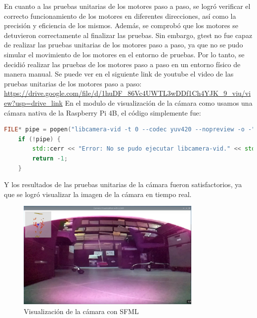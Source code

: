     En cuanto a las pruebas unitarias de los motores paso a paso, se logr\'o verificar el correcto funcionamiento de los motores en diferentes direcciones,
    as\'i como la precisi\'on y eficiencia de los mismos. Adem\'as, se comprob\'o que los motores se detuvieron correctamente al finalizar las pruebas.
    \vskip 0.5cm
    Sin embargo, gtest no fue capaz de realizar las pruebas unitarias de los motores paso a paso, ya que no se pudo simular el movimiento de los motores
    en el entorno de pruebas. Por lo tanto, se decidi\'o realizar las pruebas de los motores paso a paso en un entorno f\'isico de manera manual.
    Se puede ver en el siguiente link de youtube el video de las pruebas unitarias de los motores paso a paso: \url{https://drive.google.com/file/d/1huDF_86Vc4UWTL3wDDf1Ch4YJK_9_viu/view?usp=drive_link}
    \vskip 0.5cm
    En el modulo de visualizaci\'on de la c\'amara como usamos una c\'amara nativa de la Raspberry Pi 4B, el c\'odigo simplemente fue: 
    \begin{lstlisting}[language={C++}, caption={main.cpp}, label={Script}]
        FILE* pipe = popen("libcamera-vid -t 0 --codec yuv420 --nopreview -o -", "r");
    if (!pipe) {
        std::cerr << "Error: No se pudo ejecutar libcamera-vid." << std::endl;
        return -1;
    }
    \end{lstlisting}
    \vskip 0.5cm
    Y los resultados de las pruebas unitarias de la c\'amara fueron satisfactorios, ya que se logr\'o visualizar la imagen de la c\'amara en tiempo real.
    \vskip 0.5cm
    \begin{figure}[htbp]
        \centering
        \includegraphics[width=0.8\textwidth]{./images/Pruebas/robot/CamaraSFML01.png}
        \caption{Visualizaci\'on de la c\'amara con SFML}
        \label{fig:CameraTest1}
    \end{figure}
